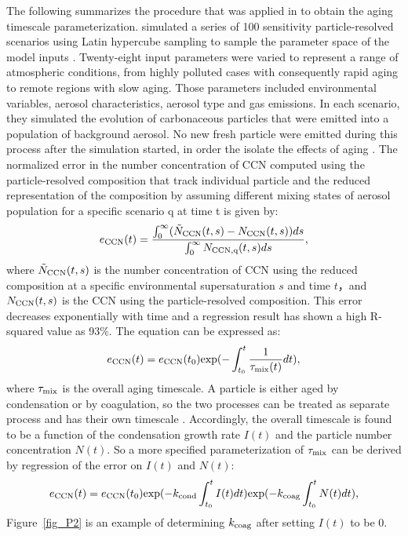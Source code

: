 \documentclass[12pt, fullpage]{uiucthesis2009}
\begin{document}
	The following summarizes the procedure that was applied in \citet{Fierce2016} to obtain the aging timescale parameterization. \citet{Fierce2016} simulated a series of 100 sensitivity particle-resolved scenarios using Latin hypercube sampling to sample the parameter space of the model inputs \citep{mckay1979comparison}. Twenty-eight input parameters were varied to represent a range of atmospheric conditions, from highly polluted cases with consequently rapid aging to remote regions with slow aging. Those parameters included environmental variables, aerosol characteristics, aerosol type and gas emissions. In each scenario, they simulated the evolution of carbonaceous particles that were emitted into a population of background aerosol. No new fresh particle were emitted during this process after the simulation started, in order the isolate the effects of aging \citep{Fierce2016}. The normalized error in the number concentration of CCN computed using the particle-resolved composition that track individual particle and the reduced representation of the composition by assuming different mixing states of aerosol population for a specific scenario q at time t is given by:
	\begin{align}\label{eq:11}
	e_{\rm CCN}(t) = \frac{\int_{0}^{\infty}( \tilde{N}_{\rm CCN}(t,s) - 
		N_{\rm CCN} (t,s))ds}{\int_{0}^{\infty} N_{\rm CCN, q}(t,s)ds},
	\end{align}
	where $\tilde{N}_{\rm CCN}(t,s)$ is the number concentration of CCN using the reduced composition at a specific environmental supersaturation $s$ and time $t$，and $N_{\rm CCN}(t,s)$ is the CCN using the particle-resolved composition. This error decreases exponentially with time and a regression result has shown a high R-squared value as 93$\%$. The equation can be expressed as:
	\begin{align}
	e_{\rm CCN}(t) = e_{\rm CCN}(t_{0})\text{exp}(-\int_{t_{0}}^{t}\frac{1}{\tau_{\rm mix}(t)} dt), 
	\end{align}
	where $\tau_{\rm mix}$ is the overall aging timescale. 
	A particle is either aged by condensation or by coagulation, so the two processes can be treated as separate process and has their own timescale \citep{Fierce2015}. Accordingly, the overall timescale is found to be a function of the condensation growth rate $I(t)$ and the particle number concentration $N(t)$.
	So a more specified parameterization of $\tau_{\rm mix}$ can be derived by regression of the error on $I(t)$ and $N(t)$:
	\begin{align}
	e_{\rm CCN}(t) = e_{\rm CCN}(t_{0})\text{exp}(-k_{\rm cond}\int_{t_{0}}^{t} I(t) dt)\text{exp}(-k_{\rm coag}\int_{t_{0}}^{t}N(t) dt), 
	\end{align}
	Figure~\ref{fig_P2} is an example of determining $k_{\rm coag}$ after setting $I(t)$ to be 0. 
	
\end{document}
